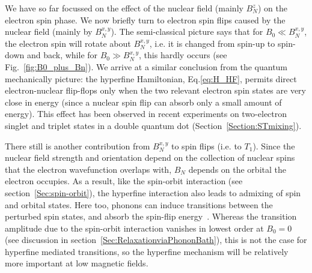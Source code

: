 \documentclass[12pt,aps,nofootinbib]{revtex4-1}
\begin{document}
We have so far focussed on the effect of the nuclear field (mainly $B_N^z$) on the electron spin phase. We now briefly turn to electron spin flips caused by the nuclear field (mainly by $B_N^{x,y}$). The semi-classical picture says that for $B_0 \ll B_N^{x,y}$, the electron spin will rotate about $B_N^{x,y}$, i.e. it is changed from spin-up to spin-down and back, while for $B_0 \gg B_N^{x,y}$, this hardly occurs (see Fig.~\ref{fig:B0_plus_Bn}). We arrive at a similar conclusion from the quantum mechanically picture: the hyperfine Hamiltonian, Eq.\ref{eq:H_HF}, permits direct electron-nuclear flip-flops only when the two relevant electron spin states are very close in energy (since a nuclear spin flip can absorb only a small amount of energy). This effect has been observed in recent experiments on two-electron singlet and triplet states in a double quantum dot\cite{johnson05} (Section~\ref{Section:STmixing}).

There still is another contribution from $B_N^{x,y}$ to spin flips (i.e. to $T_1$). Since the nuclear field strength and orientation depend on the collection of nuclear spins that the electron wavefunction overlaps with, $B_N$ depends on the orbital the electron occupies. As a result, like the spin-orbit interaction (see section~\ref{Sec:spin-orbit}), the hyperfine interaction also leads to admixing of spin and orbital states. Here too, phonons can induce transitions between the perturbed spin states, and absorb the spin-flip energy~\cite{erlingsson01,erlingsson02,erlingsson04,abalmassov04}.
Whereas the transition amplitude due to the spin-orbit interaction
vanishes in lowest order at $B_0=0$ (see discussion in section~\ref{Sec:RelaxationviaPhononBath}), this is not the case for hyperfine mediated transitions, so the hyperfine mechanism will
be relatively more important at low magnetic fields.


\end{document}
